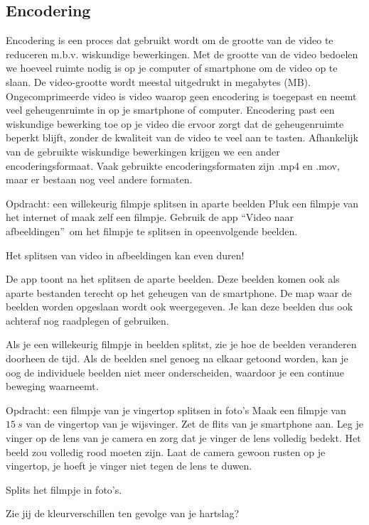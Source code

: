 \subsection{Encodering}

Encodering is een proces dat gebruikt wordt om de grootte van de video te reduceren m.b.v. wiskundige bewerkingen. Met de grootte van de video bedoelen we hoeveel ruimte nodig is op je computer of smartphone om de video op te slaan. De video-grootte wordt meestal uitgedrukt in megabytes (MB). Ongecomprimeerde video is video waarop geen encodering is toegepast en neemt veel geheugenruimte in op je smartphone of computer. Encodering past een wiskundige bewerking toe op je video die ervoor zorgt dat de geheugenruimte beperkt blijft, zonder de kwaliteit van de video te veel aan te tasten. Afhankelijk van de gebruikte wiskundige bewerkingen krijgen we een ander encoderingsformaat. Vaak gebruikte encoderingsformaten zijn .mp4 en .mov, maar er bestaan nog veel andere formaten.


\begin{opdracht}{Opdracht: een willekeurig filmpje splitsen in aparte beelden}
Pluk een filmpje van het internet of maak zelf een filmpje. Gebruik de app \textquotedblleft Video naar afbeeldingen\textquotedblright \ om het filmpje te splitsen in opeenvolgende beelden. 

\begin{opmerking}
Het splitsen van video in afbeeldingen kan even duren!
\end{opmerking}

De app toont na het splitsen de aparte beelden. Deze beelden komen ook als aparte bestanden terecht op het geheugen van de smartphone. De map waar de beelden worden opgeslaan wordt ook weergegeven. Je kan deze beelden dus ook achteraf nog raadplegen of gebruiken.

\end{opdracht}

Als je een willekeurig filmpje in beelden splitst, zie je hoe de beelden veranderen doorheen de tijd. Als de beelden snel genoeg na elkaar getoond worden, kan je oog de individuele beelden niet meer onderscheiden, waardoor je een continue beweging waarneemt.

\begin{opdracht}{Opdracht: een filmpje van je vingertop splitsen in foto's}
	Maak een filmpje van $15~s$ van de vingertop van je wijsvinger. Zet de flits van je smartphone aan. Leg je vinger op de lens van je camera en zorg dat je vinger de lens volledig bedekt. Het beeld zou volledig rood moeten zijn. Laat de camera gewoon rusten op je vingertop, je hoeft je vinger niet tegen de lens te duwen. 
	
	Splits het filmpje in foto's. 
	
	Zie jij de kleurverschillen ten gevolge van je hartslag?
\end{opdracht}


